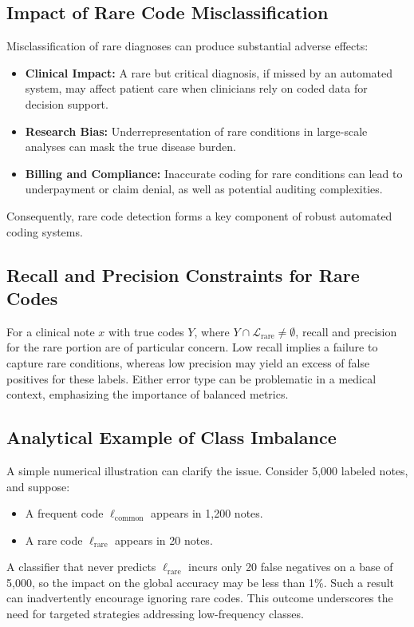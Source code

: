 \subsection{Impact of Rare Code Misclassification}
Misclassification of rare diagnoses can produce substantial adverse effects:

\begin{itemize}
    \item \textbf{Clinical Impact:} A rare but critical diagnosis, if missed by an automated system, may affect patient care when clinicians rely on coded data for decision support.
    \item \textbf{Research Bias:} Underrepresentation of rare conditions in large-scale analyses can mask the true disease burden.
    \item \textbf{Billing and Compliance:} Inaccurate coding for rare conditions can lead to underpayment or claim denial, as well as potential auditing complexities.
\end{itemize}

Consequently, rare code detection forms a key component of robust automated coding systems.

\subsection{Recall and Precision Constraints for Rare Codes}
For a clinical note \(x\) with true codes \(Y\), where \(Y \cap \mathcal{L}_{\text{rare}} \neq \emptyset\), recall and precision for the rare portion are of particular concern. Low recall implies a failure to capture rare conditions, whereas low precision may yield an excess of false positives for these labels. Either error type can be problematic in a medical context, emphasizing the importance of balanced metrics.

\subsection{Analytical Example of Class Imbalance}
A simple numerical illustration can clarify the issue. Consider 5,000 labeled notes, and suppose:
\begin{itemize}
    \item A frequent code \(\ell_{\mathrm{common}}\) appears in 1,200 notes.
    \item A rare code \(\ell_{\mathrm{rare}}\) appears in 20 notes.
\end{itemize}
A classifier that never predicts \(\ell_{\mathrm{rare}}\) incurs only 20 false negatives on a base of 5,000, so the impact on the global accuracy may be less than 1\%. Such a result can inadvertently encourage ignoring rare codes. This outcome underscores the need for targeted strategies addressing low-frequency classes.

